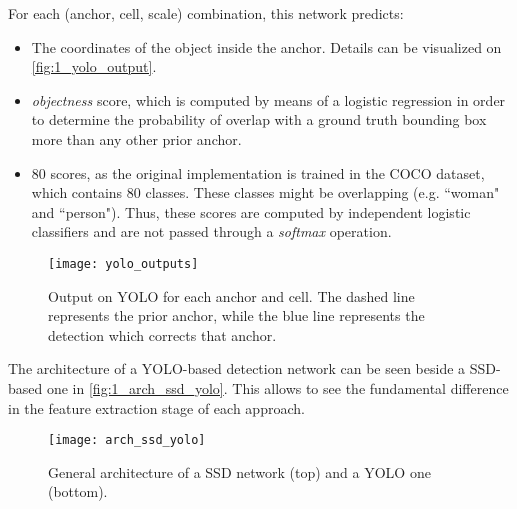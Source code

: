 For each (anchor, cell, scale) combination, this network predicts:

\begin{itemize}
	\item The coordinates of the object inside the anchor. Details can be visualized on \autoref{fig:1_yolo_output}.
	
	\item \textit{objectness} score, which is computed by means of a logistic regression in order to determine the probability of overlap with a ground truth bounding box more than any other prior anchor.
	
	\item 80 scores, as the original implementation is trained in the COCO dataset, which contains 80 classes. These classes might be overlapping (e.g. ``woman" and ``person"). Thus, these scores are computed by independent logistic classifiers and are not passed through a \textit{softmax} operation.
\end{itemize}


\begin{figure}[h]
	\centering
	\texttt{[image: yolo\_outputs]}
	\caption{Output on YOLO for each anchor and cell. The dashed line represents the prior anchor, while the blue line represents the detection which corrects that anchor.}
	\label{fig:1_yolo_output}
\end{figure}


The architecture of a YOLO-based detection network can be seen beside a SSD-based one in \autoref{fig:1_arch_ssd_yolo}. This allows to see the fundamental difference in the feature extraction stage of each approach.

\begin{figure}[h]
	\centering
	\texttt{[image: arch\_ssd\_yolo]}
	\caption{General architecture of a SSD network (top) and a YOLO one (bottom).}
	\label{fig:1_arch_ssd_yolo}
\end{figure}


